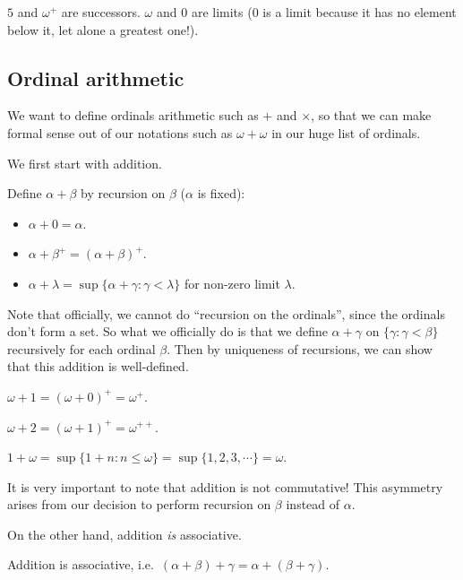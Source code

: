 \documentclass[a4paper]{article}
\begin{document}
\begin{eg}
  $5$ and $\omega^+$ are successors. $\omega$ and $0$ are limits ($0$ is a limit because it has no element below it, let alone a greatest one!).
\end{eg}

\subsection{Ordinal arithmetic}
We want to define ordinals arithmetic such as $+$ and $\times$, so that we can make formal sense out of our notations such as $\omega + \omega$ in our huge list of ordinals.

We first start with addition.
\begin{defi}
  Define $\alpha + \beta$ by recursion on $\beta$ ($\alpha$ is fixed):
  \begin{itemize}
    \item $\alpha + 0 = \alpha$.
    \item $\alpha + \beta^+ = (\alpha + \beta)^+$.
    \item $\alpha + \lambda = \sup \{\alpha + \gamma: \gamma < \lambda\}$ for non-zero limit $\lambda$.
  \end{itemize}
\end{defi}
Note that officially, we cannot do ``recursion on the ordinals'', since the ordinals don't form a set. So what we officially do is that we define $\alpha + \gamma$ on $\{\gamma: \gamma < \beta\}$ recursively for each ordinal $\beta$. Then by uniqueness of recursions, we can show that this addition is well-defined.

\begin{eg}
  $\omega + 1 = (\omega + 0)^+ = \omega^+$.

  $\omega + 2 = (\omega + 1)^+ = \omega^{++}$.

  $1 + \omega = \sup\{ 1 + n: n \leq \omega\} = \sup\{1, 2, 3, \cdots\} = \omega$.
\end{eg}
It is very important to note that addition is not commutative! This asymmetry arises from our decision to perform recursion on $\beta$ instead of $\alpha$.

On the other hand, addition \emph{is} associative.
\begin{prop}
  Addition is associative, i.e.\ $(\alpha + \beta) + \gamma = \alpha + (\beta + \gamma)$.
\end{prop}
\end{document}
